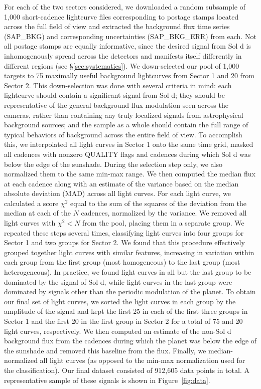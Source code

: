 \documentclass[modern]{aastex62}
\begin{document}
For each of the two sectors considered, we downloaded a random subsample of 
1,000 short-cadence lightcurve files corresponding to postage stamps located 
across the full \TESS field of view and extracted the background flux time 
series (\textsf{SAP\_BKG}) and corresponding uncertainties
(\textsf{SAP\_BKG\_ERR}) from each. 
Not all postage stamps are equally informative, since the desired signal from 
Sol d is inhomogenously spread across the \TESS detectors and manifests itself
differently in different regions (see \S\ref{sec:systematics}). 
We down-selected our pool of 1,000 targets to 75 maximally useful background 
lightcurves from Sector 1 and 20 from Sector 2. 
This down-selection was done with several criteria in mind: each lightcurve 
should contain a significant signal from Sol d; they should be representative 
of the general background flux modulation seen across the \TESS cameras, rather 
than containing any truly localized signals from astrophysical background 
sources; and the sample as a whole should contain the full range of typical 
behaviors of background across the entire \TESS field of view. 
To accomplish this, we interpolated all light curves in Sector 1 onto the same time
grid, masked all cadences with nonzero \textsf{QUALITY} flags and
cadences during which Sol d was below the edge of the sunshade.
During the selection step only, we also normalized them to the same min-max range.
We then computed the median
flux at each cadence along with an estimate of the variance based on the
median absolute deviation (MAD) across all light curves.
For each light curve, we calculated a score $\chi^2$ equal to the sum of the squares of the
deviation from the median at each of the $N$ cadences, normalized by the variance.
We removed all light curves with $\chi^2 < N$ from the pool, placing
them in a separate group. We repeated these steps several times,
classifying light curves into four groups for Sector 1 and two groups for Sector 2. 
We found that this
procedure effectively grouped together light curves with similar features,
increasing in variation within each group from the first group (most homogeneous) 
to the last group (most heterogeneous). In practice, we found light curves
in all but the last group to be dominated by 
the signal of Sol d, while light
curves in the last group were dominated by signals other than the
periodic modulation of the planet. To obtain our final set of light curves, 
we sorted the light curves in each group by the amplitude
of the signal and kept the first 25 in each of the first three groups in Sector 1
and the first 20 in the first group in Sector 2 for a total
of 75 and 20 light curves, respectively. We then computed an estimate of the
non-Sol d background flux from the cadences during which the planet was below
the edge of the sunshade and removed this baseline from the flux.
Finally, we median-normalized all light curves (as opposed to the min-max
normalization used for the classification).
Our final dataset consisted of 912,605 data points in total. 
A representative sample of these signals is shown in Figure~\ref{fig:data}.
\end{document}
